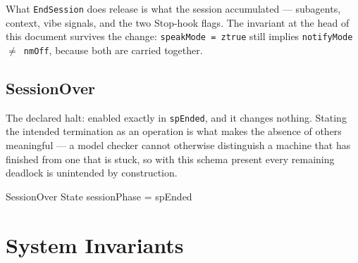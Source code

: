 \documentclass[a4paper,10pt,fleqn]{article}
\begin{document}
What \texttt{EndSession} does release is what the session accumulated ---
subagents, context, vibe signals, and the two Stop-hook flags. The
invariant at the head of this document survives the change:
\texttt{speakMode = ztrue} still implies \texttt{notifyMode $\neq$ nmOff},
because both are carried together.

\subsection{SessionOver}

The declared halt: enabled exactly in \texttt{spEnded}, and it changes
nothing. Stating the intended termination as an operation is what makes
the absence of others meaningful --- a model checker cannot otherwise
distinguish a machine that has finished from one that is stuck, so with
this schema present every remaining deadlock is unintended by
construction.

\begin{schema}{SessionOver}
  \Xi State
  \where
  sessionPhase = spEnded
\end{schema}


\section{System Invariants}
\end{document}
